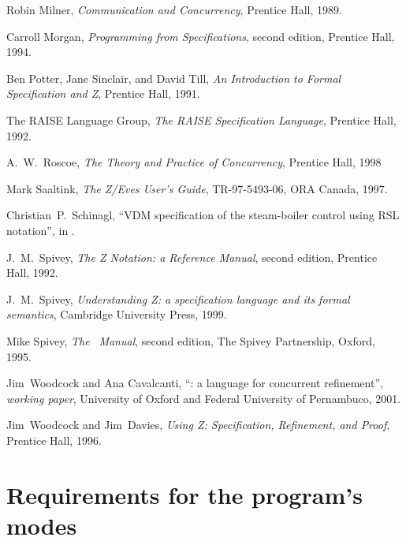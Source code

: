 \documentclass{report}
\begin{document}
\begin{thebibliography}{XX}
 Robin Milner, \emph{Communication and
    Concurrency}, Prentice Hall, 1989.

 Carroll Morgan, \emph{Programming from
    Specifications}, second edition, Prentice Hall, 1994.

 Ben Potter, Jane Sinclair, and David
  Till, \emph{An Introduction to Formal Specification and Z}, Prentice
  Hall, 1991.

 The RAISE Language Group, \emph{The RAISE
    Specification Language}, Prentice Hall, 1992.

 A.~W.~Roscoe, \emph{The Theory and Practice of
    Concurrency}, Prentice Hall, 1998

 Mark Saaltink, \emph{The Z/Eves User's Guide},
  TR-97-5493-06, ORA Canada, 1997.

 Christian~P.~Schinagl, ``VDM specification of
  the steam-boiler control using RSL notation'', in
  \cite[pp.428--452]{abrial-borger-langmaack-96}.

 J.~M.~Spivey, \emph{The Z Notation: a Reference
    Manual}, second edition, Prentice Hall, 1992.

 J.~M.~Spivey, \emph{Understanding Z: a
    specification language and its formal semantics}, Cambridge
  University Press, 1999.

 Mike Spivey, \emph{The} \fuzz\ \emph{Manual}, second
  edition, The Spivey Partnership, Oxford, 1995.

 Jim~Woodcock and Ana Cavalcanti,
  ``\Circus: a language for concurrent refinement'', \emph{working
    paper}, University of Oxford and Federal University of Pernambuco,
  2001.

 Jim~Woodcock and Jim~Davies, \emph{Using
    Z: Specification, Refinement, and Proof}, Prentice Hall, 1996.

\end{thebibliography}


\appendix

\chapter{Requirements for the program's modes}
\label{appendix:requirements}
\end{document}
